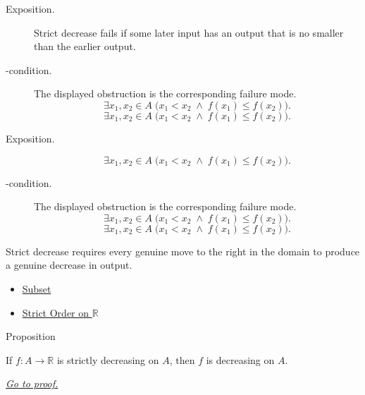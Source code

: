 \begin{remark*}
\begin{description}
  \item[Exposition.]
Strict decrease fails if some later input has an output that is no smaller
than the earlier output.


  \item[\exists-condition.]
  The displayed obstruction is the corresponding failure mode.
  \[
  \exists x_1,x_2\in A\;\bigl(x_1<x_2\;\wedge\;f(x_1)\leq f(x_2)\bigr).
\]
  \[
  \exists x_1,x_2\in A\;\bigl(x_1<x_2\;\wedge\;f(x_1)\leq f(x_2)\bigr).
\]
\end{description}
\end{remark*}

\begin{remark*}
\begin{description}
  \item[Exposition.]
\[
  \exists x_1,x_2\in A\;\bigl(x_1<x_2\;\wedge\;f(x_1)\leq f(x_2)\bigr).
\]


  \item[\exists-condition.]
  The displayed obstruction is the corresponding failure mode.
  \[
  \exists x_1,x_2\in A\;\bigl(x_1<x_2\;\wedge\;f(x_1)\leq f(x_2)\bigr).
\]
  \[
  \exists x_1,x_2\in A\;\bigl(x_1<x_2\;\wedge\;f(x_1)\leq f(x_2)\bigr).
\]
\end{description}
\end{remark*}

\begin{remark*}[Interpretation]
Strict decrease requires every genuine move to the right in the domain to
produce a genuine decrease in output.
\end{remark*}

\begin{dependencies}
\begin{itemize}
  \item \hyperref[def:subset]{Subset}
  \item \hyperref[def:strict-order-on-r]{Strict Order on $\mathbb{R}$}
\end{itemize}
\end{dependencies}

\begin{propositionbox}{Proposition}
\begin{proposition}
\label{prop:strictly-decreasing-implies-decreasing}
If \(f:A\to\mathbb{R}\) is strictly decreasing on \(A\), then \(f\) is
decreasing on \(A\).

\smallskip\noindent
\hyperref[prf:strictly-decreasing-implies-decreasing]{\textit{Go to proof.}}
\end{proposition}
\end{propositionbox}

